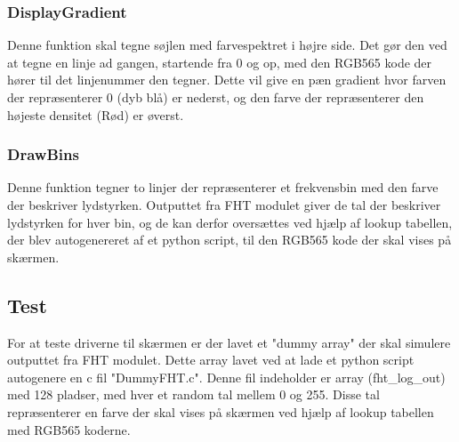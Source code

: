 \subsubsection{DisplayGradient}
Denne funktion skal tegne søjlen med farvespektret i højre side. Det gør den ved at tegne en linje ad gangen, startende fra 0 og op, med den RGB565 kode der hører til det linjenummer den tegner.
Dette vil give en pæn gradient hvor farven der repræsenterer 0 (dyb blå) er nederst, og den farve der repræsenterer den højeste densitet (Rød) er øverst.

\subsubsection{DrawBins}
Denne funktion tegner to linjer der repræsenterer et frekvensbin med den farve der beskriver lydstyrken. Outputtet fra FHT modulet giver de tal der beskriver lydstyrken for hver bin, og de kan derfor oversættes ved hjælp af lookup tabellen, der blev autogenereret af et python script, til den RGB565 kode der skal vises på skærmen.

\subsection{Test}
For at teste driverne til skærmen er der lavet et "dummy array" der skal simulere outputtet fra FHT modulet. Dette array lavet ved at lade et python script autogenere en c fil "DummyFHT.c". Denne fil indeholder er array (fht\_log\_out) med 128 pladser, med hver et random tal mellem 0 og 255. Disse tal repræsenterer en farve der skal vises på skærmen ved hjælp af lookup tabellen med RGB565 koderne.


%